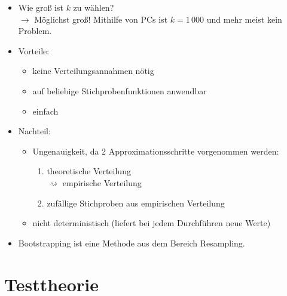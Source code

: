 \begin{itemize}
\item Wie groß ist $k$ zu wählen?\\
$\to$ Möglichst groß! Mithilfe von PCs ist $k=1\,000$ und mehr meist kein Problem.
\item Vorteile:
\begin{itemize}
\item keine Verteilungsannahmen nötig
\item auf beliebige Stichprobenfunktionen anwendbar
\item einfach
\end{itemize}
\item Nachteil:
\begin{itemize}
\item Ungenauigkeit, da 2 Approximationsschritte vorgenommen werden:
\begin{enumerate}
\item theoretische Verteilung \\
$\rightsquigarrow$ empirische Verteilung
\item zufällige Stichproben aus empirischen Verteilung
\end{enumerate}
\item nicht deterministisch (liefert bei jedem Durchführen neue Werte)
\end{itemize}
\item Bootstrapping ist eine Methode aus dem Bereich Resampling.
\end{itemize}

\section{Testtheorie}
